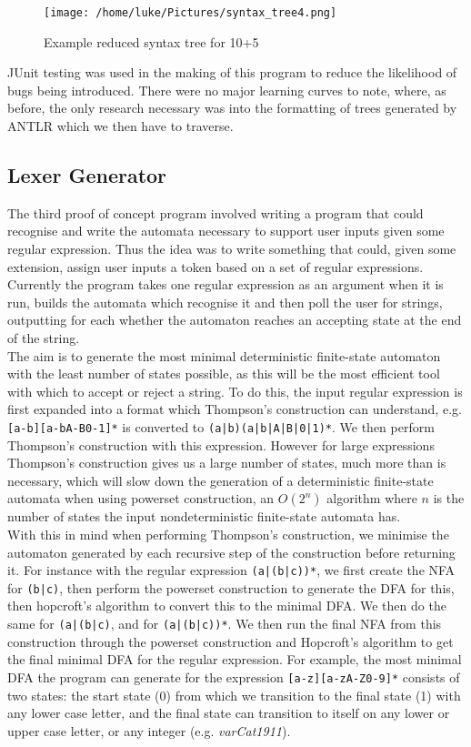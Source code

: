 \documentclass[a4paper, 11pt]{article}
\begin{document}
\begin{figure}[ht!]
	\centering
	\texttt{[image: /home/luke/Pictures/syntax\_tree4.png]}
	{\caption{Example reduced syntax tree for 10+5}}
\end{figure}

\noindent JUnit testing was used in the making of this program to reduce the likelihood of bugs being introduced. There were no major learning curves to note, where, as before, the only research necessary was into the formatting of trees generated by ANTLR which we then have to traverse. 

\subsection{Lexer Generator}
The third proof of concept program involved writing a program that could recognise and write the automata necessary to support user inputs given some regular expression. Thus the idea was to write something that could, given some extension, assign user inputs a token based on a set of regular expressions. Currently the program takes one regular expression as an argument when it is run, builds the automata which recognise it and then poll the user for strings, outputting for each whether the automaton reaches an accepting state at the end of the string.
\\\newline 
The aim is to generate the most minimal deterministic finite-state automaton with the least number of states possible, as this will be the most efficient tool with which to accept or reject a string. To do this, the input regular expression is first expanded into a format which Thompson's construction can understand, e.g. \texttt{[a-b][a-bA-B0-1]*} is converted to \texttt{(a|b)(a|b|A|B|0|1)*}. We then perform Thompson's construction with this expression. However for large expressions Thompson's construction gives us a large number of states, much more than is necessary, which will slow down the generation of a deterministic finite-state automata when using powerset construction, an $O(2^n)$ algorithm where $n$ is the number of states the input nondeterministic finite-state automata has.
\\\newline
With this in mind when performing Thompson's construction, we minimise the automaton generated by each recursive step of the construction before returning it. For instance with the regular expression \texttt{(a|(b|c))*}, we first create the NFA for \texttt{(b|c)}, then perform the powerset construction to generate the DFA for this, then hopcroft's algorithm to convert this to the minimal DFA. We then do the same for \texttt{(a|(b|c)}, and for \texttt{(a|(b|c))*}. We then run the final NFA from this construction through the powerset construction and Hopcroft's algorithm to get the final minimal DFA for the regular expression. For example, the most minimal DFA the program can generate for the expression \texttt{[a-z][a-zA-Z0-9]*} consists of two states: the start state (0) from which we transition to the final state (1) with any lower case letter, and the final state can transition to itself on any lower or upper case letter, or any integer (e.g. \textit{varCat1911}).
\end{document}
